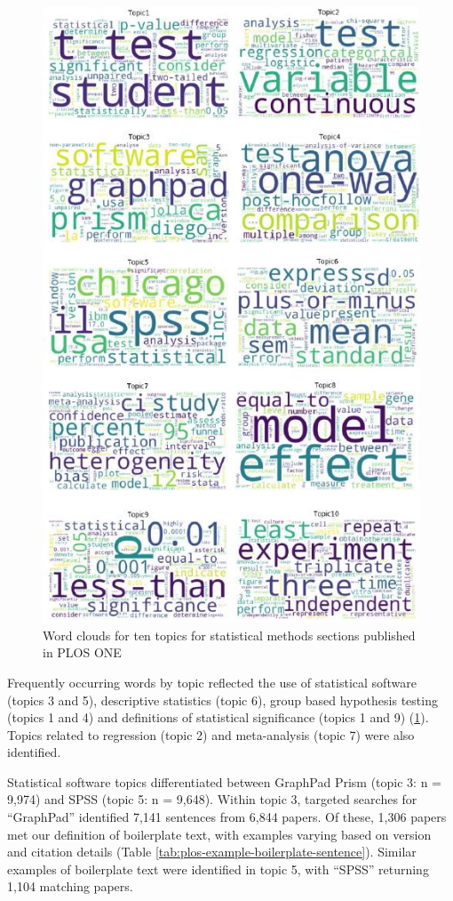 \documentclass[12pt]{article}
\begin{document}
\begin{figure}

{\centering \includegraphics[width=0.8\linewidth]{figures/ploswordclouds} 

}

\caption{\label{fig:plos-clouds}Word clouds for ten topics for statistical methods sections published in PLOS ONE}\label{fig:plos-clouds}
\end{figure}

Frequently occurring words by topic reflected the use of statistical software
(topics 3 and 5), descriptive statistics (topic 6), group based
hypothesis testing (topics 1 and 4) and definitions of statistical
significance (topics 1 and 9) (\ref{fig:plos-clouds}). Topics related to
regression (topic 2) and meta-analysis (topic 7) were also identified.

Statistical software topics differentiated between
GraphPad Prism (topic 3: n = 9,974) and SPSS (topic 5: n = 9,648).
Within topic 3, targeted searches for ``GraphPad'' identified 7,141 sentences from 6,844 papers. Of these,
1,306 papers met our definition of boilerplate text, with examples varying based on version and citation details (Table \ref{tab:plos-example-boilerplate-sentence}).
Similar examples of boilerplate text were identified in topic 5, with ``SPSS'' returning 1,104 matching papers.
\end{document}
